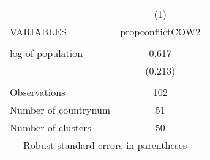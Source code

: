 \begin{tabular}{lc} \hline
 & (1) \\
VARIABLES & propconflictCOW2 \\ \hline
 &  \\
log of population & 0.617 \\
 & (0.213) \\
 &  \\
Observations & 102 \\
Number of countrynum & 51 \\
 Number of clusters & 50 \\ \hline
\multicolumn{2}{c}{ Robust standard errors in parentheses} \\
\end{tabular}
